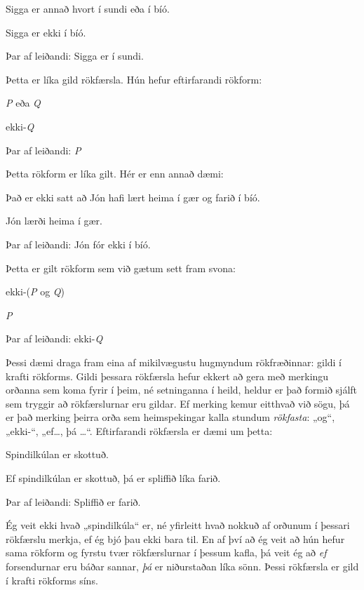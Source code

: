 	\begin{earg}
		\item[] Sigga er annað hvort í sundi eða í bíó.
		\item[] Sigga er ekki í bíó.
		\item[Þar af leiðandi:] Sigga er í sundi.
	\end{earg}
Þetta er líka gild rökfærsla. Hún hefur eftirfarandi rökform:
	\begin{earg}
		\item[] \emph{P} eða \emph{Q}
		\item[] ekki-\emph{Q}
		\item[Þar af leiðandi:] \emph{P}
	\end{earg}
Þetta rökform er líka gilt. Hér er enn annað dæmi:
	\begin{earg}
		\item[] Það er ekki satt að Jón hafi lært heima í gær og farið í bíó.		
		\item[] Jón lærði heima í gær.
		\item[Þar af leiðandi:] Jón fór ekki í bíó.
	\end{earg}
Þetta er gilt rökform sem við gætum sett fram svona:

	\begin{earg}
		\item[] ekki-(\emph{P} og \emph{Q})
		\item[] \emph{P}
		\item[Þar af leiðandi:] ekki-\emph{Q}
	\end{earg}
	
Þessi dæmi draga fram eina af mikilvægustu hugmyndum rökfræðinnar: gildi í krafti rökforms. Gildi þessara rökfærsla hefur ekkert að gera með merkingu orðanna sem koma fyrir í þeim, né setninganna í heild, heldur er það formið sjálft sem tryggir að rökfærslurnar eru gildar. Ef merking kemur eitthvað við sögu, þá er það merking þeirra orða sem heimspekingar kalla stundum \emph{rökfasta}: „og“, „ekki-“, „ef\ldots, þá \ldots“. Eftirfarandi rökfærsla er dæmi um þetta:

	\begin{earg}
		\item[] Spindilkúlan er skottuð.
		\item[] Ef spindilkúlan er skottuð, þá er spliffið líka farið.
		\item[Þar af leiðandi:] Spliffið er farið.
	\end{earg}	
Ég veit ekki hvað „spindilkúla“ er, né yfirleitt hvað nokkuð af orðunum í þessari rökfærslu merkja, ef ég bjó þau ekki bara til. En af því að ég veit að hún hefur sama rökform og fyrstu tvær rökfærslurnar í þessum kafla, þá veit ég að \emph{ef} forsendurnar eru báðar sannar, \emph{þá} er niðurstaðan líka sönn. Þessi rökfærsla er gild í krafti rökforms síns.

